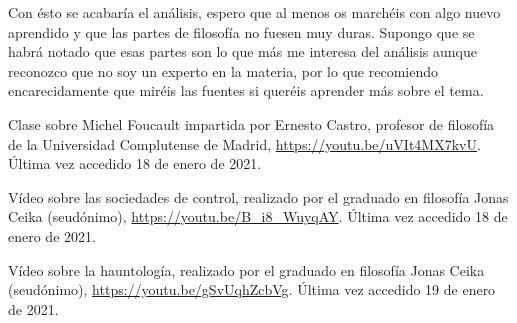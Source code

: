 \documentclass[11pt]{article}
\begin{document}
Con ésto se acabaría el análisis, espero que al menos os marchéis con algo nuevo aprendido y que las partes de filosofía no fuesen muy duras. Supongo que se habrá notado que esas partes son lo que más me interesa del análisis aunque reconozco que no soy un experto en la materia, por lo que recomiendo encarecidamente que miréis las fuentes si queréis aprender más sobre el tema.
\begin{thebibliography}{8}
        Clase sobre Michel Foucault impartida por Ernesto Castro, profesor de filosofía de la Universidad Complutense de Madrid, \url{https://youtu.be/uVIt4MX7kvU}. Última vez accedido 18 de enero de 2021.

        Vídeo sobre las sociedades de control, realizado por el graduado en filosofía Jonas Ceika (seudónimo), \url{https://youtu.be/B_i8_WuyqAY}. Última vez accedido 18 de enero de 2021.

        Vídeo sobre la hauntología, realizado por el graduado en filosofía Jonas Ceika (seudónimo), \url{https://youtu.be/gSvUqhZcbVg}. Última vez accedido 19 de enero de 2021.
\end{thebibliography}
\end{document}
